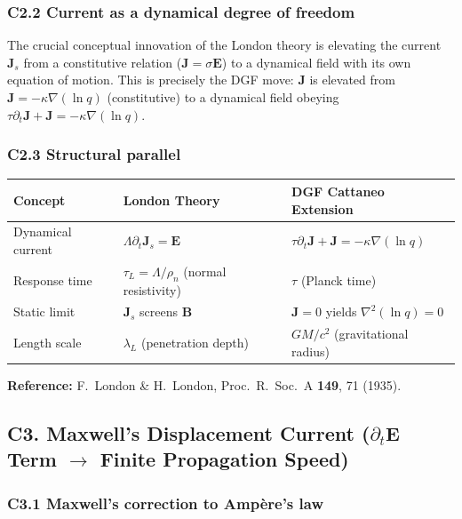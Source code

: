 \documentclass[reprint]{revtex4-2}
\begin{document}
\subsubsection{C2.2 Current as a dynamical degree of freedom}

The crucial conceptual innovation of the London theory is elevating the current $\mathbf{J}_s$ from a constitutive relation ($\mathbf{J} = \sigma\mathbf{E}$) to a dynamical field with its own equation of motion. This is precisely the DGF move: $\mathbf{J}$ is elevated from $\mathbf{J} = -\kappa\nabla(\ln q)$ (constitutive) to a dynamical field obeying $\tau\partial_t\mathbf{J} + \mathbf{J} = -\kappa\nabla(\ln q)$.

\subsubsection{C2.3 Structural parallel}

\begin{center}
\begin{tabular}{lll}
\toprule
Concept & London Theory & DGF Cattaneo Extension \\
\midrule
Dynamical current & $\Lambda\partial_t\mathbf{J}_s = \mathbf{E}$ & $\tau\partial_t\mathbf{J} + \mathbf{J} = -\kappa\nabla(\ln q)$\\
Response time & $\tau_L = \Lambda/\rho_n$ (normal resistivity) & $\tau$ (Planck time)\\
Static limit & $\mathbf{J}_s$ screens $\mathbf{B}$ & $\mathbf{J}=0$ yields $\nabla^2(\ln q)=0$\\
Length scale & $\lambda_L$ (penetration depth) & $GM/c^2$ (gravitational radius)\\
\bottomrule
\end{tabular}
\end{center}

\textbf{Reference:} F.\ London \& H.\ London, Proc.\ R.\ Soc.\ A \textbf{149}, 71 (1935).

\subsection{C3. Maxwell's Displacement Current ($\partial_t\mathbf{E}$ Term $\to$ Finite Propagation Speed)}

\subsubsection{C3.1 Maxwell's correction to Amp\`ere's law}
\end{document}
